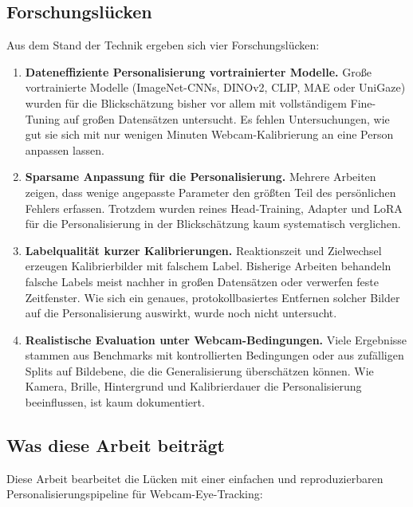 \subsection{Forschungslücken}
\label{subsec:luecken}
Aus dem Stand der Technik ergeben sich vier Forschungslücken:

\begin{enumerate}[label=\textbf{F\arabic*:}, leftmargin=*, align=left]
  \item \textbf{Dateneffiziente Personalisierung vortrainierter Modelle.}
  Große vortrainierte Modelle (ImageNet-CNNs, DINOv2, CLIP, MAE oder UniGaze)
  wurden für die Blickschätzung bisher vor allem mit vollständigem Fine-Tuning
  auf großen Datensätzen untersucht. Es fehlen Untersuchungen, wie gut sie sich
  mit nur wenigen Minuten Webcam-Kalibrierung an eine Person anpassen lassen.

  \item \textbf{Sparsame Anpassung für die Personalisierung.}
  Mehrere Arbeiten zeigen, dass wenige angepasste Parameter den größten Teil
  des persönlichen Fehlers erfassen. Trotzdem wurden reines Head-Training,
  Adapter und LoRA für die Personalisierung in der Blickschätzung kaum
  systematisch verglichen.

  \item \textbf{Labelqualität kurzer Kalibrierungen.}
  Reaktionszeit und Zielwechsel erzeugen Kalibrierbilder mit falschem Label.
  Bisherige Arbeiten behandeln falsche Labels meist nachher in großen
  Datensätzen oder verwerfen feste Zeitfenster. Wie sich ein genaues,
  protokollbasiertes Entfernen solcher Bilder auf die Personalisierung
  auswirkt, wurde noch nicht untersucht.

  \item \textbf{Realistische Evaluation unter Webcam-Bedingungen.}
  Viele Ergebnisse stammen aus Benchmarks mit kontrollierten Bedingungen oder
  aus zufälligen Splits auf Bildebene, die die Generalisierung überschätzen
  können. Wie Kamera, Brille, Hintergrund und Kalibrierdauer die
  Personalisierung beeinflussen, ist kaum dokumentiert.
\end{enumerate}

\subsection{Was diese Arbeit beiträgt}
\label{subsec:ueberleitung}
Diese Arbeit bearbeitet die Lücken mit einer einfachen und reproduzierbaren
Personalisierungspipeline für Webcam-Eye-Tracking:

